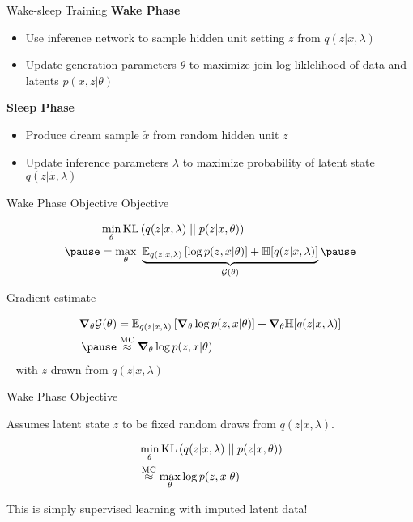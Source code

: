 \documentclass[14pt]{beamer}
\begin{document}
\begin{frame}{Wake-sleep Training}
\textbf{Wake Phase} \\
\begin{itemize}
\item Use inference network to sample hidden unit setting $ z $ from $ q(z|x,\lambda) $
\item Update generation parameters $ \theta $ to maximize join log-liklelihood of data and latents $ p(x,z|\theta) $
\end{itemize}
\pause
\textbf{Sleep Phase}
\begin{itemize}
\item Produce dream sample $ \tilde{x} $ from random hidden unit $ z $
\item Update inference parameters $ \lambda $ to maximize probability of latent state $ q(z|\tilde{x},\lambda) $
\end{itemize}
\end{frame}

\begin{frame}{Wake Phase Objective}
Objective  %

\vspace{-15pt}

\begin{equation*}
\begin{aligned}
&\min_{\theta} \KL{q(z|x, \lambda)}{p(z|x, \theta)} \\ \pause
&= \max_{\theta}~ \underbrace{\mathbb E_{q(z|x, \lambda)}\left[ \log p(z, x| \theta) \right] + \mathbb H[q(z|x, \lambda)]}_{\mathcal G(\theta)}  \pause
\end{aligned}
\end{equation*}

Gradient estimate

\begin{equation*}
\begin{aligned}
\grad_\theta \mathcal G(\theta) &= \mathbb E_{q(z|x, \lambda)}\left[ \grad_\theta \log p(z, x| \theta) \right] + \grad_\theta \mathbb H[q(z|x, \lambda)] \\ \pause
&\overset{\text{MC}}{\approx} \grad_\theta \log p(z, x| \theta) 
\end{aligned}
\end{equation*} 
~ with $ z $ drawn from $ q(z|x,\lambda) $ 
\end{frame}

\begin{frame}{Wake Phase Objective}

Assumes latent state $ z $ to be fixed random draws from $ q(z|x,\lambda) $.

\begin{equation*}
\begin{aligned}
&\min_{\theta} \operatorname{KL}\left(q(z|x, \lambda)\mid\mid p(z|x, \theta)\right) \\ 
&\overset{\text{MC}}{\approx} \max_\theta \log p(z, x| \theta) 
\end{aligned}
\end{equation*} 

This is simply supervised learning with imputed latent data!

\end{frame}
\end{document}
